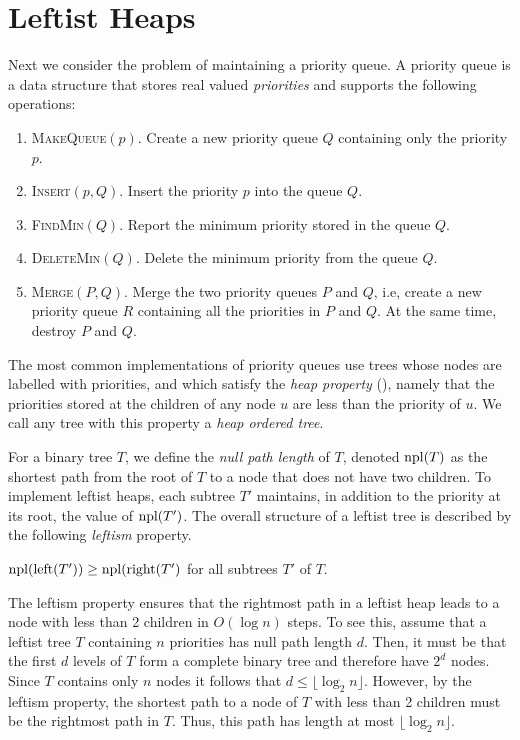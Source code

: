 \section{Leftist Heaps}

Next we consider the problem of maintaining a priority queue.  A
priority queue is a data structure that stores real valued
\emph{priorities} and supports the following operations:

\begin{enumerate}
\item \textsc{MakeQueue$(p)$}.  Create a new priority queue $Q$ containing
	only the priority $p$.

\item \textsc{Insert$(p,Q)$}. Insert the priority $p$ into the queue
$Q$.

\item \textsc{FindMin$(Q)$}. Report the minimum priority stored in
the queue $Q$.

\item \textsc{DeleteMin$(Q)$}. Delete the minimum priority from the
queue $Q$.

\item \textsc{Merge$(P,Q)$}. Merge the two priority queues $P$ and
$Q$, i.e, create a new priority queue $R$ containing all the
priorities in $P$ and $Q$.  At the same time, destroy $P$ and $Q$.
\end{enumerate}

The most common implementations of priority queues use trees whose
nodes are labelled with priorities, and which satisfy the \emph{heap
property} (), namely that the priorities stored at the
children of any node $u$ are less than the priority of $u$.  We call
any tree with this property a \emph{heap ordered tree}.

For a binary tree $T$, we define the \emph{null path length} of $T$,
denoted $\mathrm{npl}(T)$ as the shortest path from the root of $T$ to a node
that does not have two children.  To implement leftist heaps, each
subtree $T'$ maintains, in addition to the priority at its root, the
value of $\mathrm{npl}(T')$.  The overall structure of a leftist tree is
described by the following \emph{leftism} property.

\begin{prop}[Leftism]
 $\mathrm{npl}(\mathrm{left}(T'))\ge \mathrm{npl}(\mathrm{right}(T')$ for all subtrees $T'$ of $T$.
\end{prop}

The leftism property ensures that the rightmost path in a leftist heap
leads to a node with less than 2 children in $O(\log n)$ steps.  To
see this, assume that a leftist tree $T$ containing $n$ priorities has
null path length $d$.  Then, it must be that the first $d$ levels of
$T$ form a complete binary tree and therefore have $2^d$ nodes.  Since
$T$ contains only $n$ nodes it follows that $d\le \lfloor\log_2
n\rfloor$.  However, by the leftism property, the shortest path to a
node of $T$ with less than 2 children must be the rightmost path in
$T$.  Thus, this path has length at most $\lfloor\log_2 n\rfloor$.


